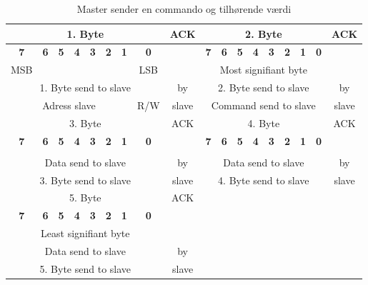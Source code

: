 \begin{table}[H]
\caption{Master sender en commando og tilhørende værdi}
\centering
\begin{tabular}{|c|c|c|c|c|c|c|c|c|c|c|c|c|c|c|c|c|c|}
\hline 
\multicolumn{8}{|c|}{1. Byte} & ACK & \multicolumn{8}{|c|}{2. Byte} & ACK \\
\hline 
\textbf{7} & \textbf{6} & \textbf{5} & \textbf{4} & \textbf{3} & \textbf{2} & \textbf{1} & \textbf{0} & \textbf{} & \textbf{7} & \textbf{6} & \textbf{5} & \textbf{4} & \textbf{3} & \textbf{2} & \textbf{1} & \textbf{0} & \textbf{} \\
\hline 
MSB & & & & & & & LSB & & \multicolumn{8}{|c|}{Most signifiant  byte} & \\ 
\hline
\multicolumn{8}{|c|}{1. Byte send to slave} & by & \multicolumn{8}{|c|}{2. Byte send to slave} & by \\
\hline
\multicolumn{7}{|c|}{Adress slave} & R/W & slave & \multicolumn{8}{|c|}{Command send to slave} & slave\\
\hline \hline
\multicolumn{8}{|c|}{3. Byte} & ACK & \multicolumn{8}{|c|}{4. Byte} & ACK \\
\hline
\textbf{7} & \textbf{6} & \textbf{5} & \textbf{4} & \textbf{3} & \textbf{2} & \textbf{1} & \textbf{0} & \textbf{} & \textbf{7} & \textbf{6} & \textbf{5} & \textbf{4} & \textbf{3} & \textbf{2} & \textbf{1} & \textbf{0} & \textbf{} \\
\hline
\multicolumn{8}{|c|}{} & & \multicolumn{8}{|c|}{} & \\
\hline
\multicolumn{8}{|c|}{Data send to slave} & by & \multicolumn{8}{|c|}{Data send to slave} & by \\
\hline
\multicolumn{8}{|c|}{3. Byte send to slave} & slave & \multicolumn{8}{|c|}{4. Byte send to slave} & slave \\
\hline \hline
\multicolumn{8}{|c|}{5. Byte} & ACK & \multicolumn{8}{|c|}{} & \\
\hline
\textbf{7} & \textbf{6} & \textbf{5} & \textbf{4} & \textbf{3} & \textbf{2} & \textbf{1} & \textbf{0} & \textbf{} & \multicolumn{8}{|c|}{} & \textbf{} \\
\hline
\multicolumn{8}{|c|}{Least signifiant  byte} & & \multicolumn{8}{|c|}{} & \\
\hline
\multicolumn{8}{|c|}{Data send to slave} & by & \multicolumn{8}{|c|}{} & \\
\hline
\multicolumn{8}{|c|}{5. Byte send to slave} & slave & \multicolumn{8}{|c|}{} & \\
\hline
\end{tabular}
\label{tabel:I2CMasterData}
\end{table} 

